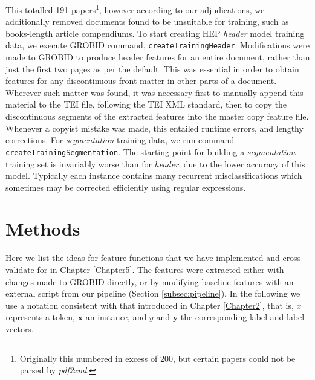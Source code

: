 This totalled 191 papers\footnote{Originally this numbered in excess of 200, but certain papers could not be parsed by \emph{pdf2xml}.}, however according to our adjudications, we additionally removed documents found to be unsuitable for training, such as books-length article compendiums. To start creating HEP \emph{header} model training data, we execute GROBID command, \texttt{createTrainingHeader}. Modifications were made to GROBID to produce header features for an entire document, rather than just the first two pages as per the default. This was essential in order to obtain features for any discontinuous front matter in other parts of a document. Wherever such matter was found, it was necessary first to manually append this material to the TEI file, following the TEI XML standard, then to copy the discontinuous segments of the extracted features into the master copy feature file. Whenever a copyist mistake was made, this entailed runtime errors, and lengthy corrections. For \emph{segmentation} training data, we run command \texttt{createTrainingSegmentation}. The starting point for building a \emph{segmentation} training set is invariably worse than for \emph{header}, due to the lower accuracy of this model. Typically each instance contains many recurrent misclassifications which sometimes may be corrected efficiently using regular expressions.


\section{Methods}
\label{sec:featurengineering}

Here we list the ideas for feature functions that we have implemented and cross-validate for in Chapter \ref{Chapter5}. The features were extracted either with changes made to GROBID directly, or by modifying baseline features with an external script from our pipeline (Section \ref{subsec:pipeline}). In the following we use a notation consistent with that introduced in Chapter \ref{Chapter2}, that is, $x$ represents a token, $\mathbf{x}$ an instance, and $y$ and $\textbf{y}$ the corresponding label and label vectors. 


